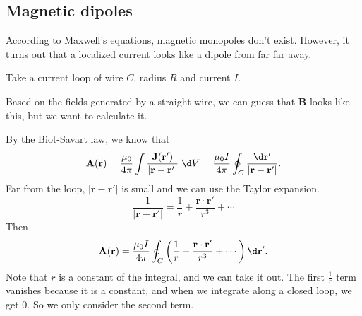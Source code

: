 \documentclass[a4paper]{article}
\begin{document}
\subsection{Magnetic dipoles}
According to Maxwell's equations, magnetic monopoles don't exist. However, it turns out that a localized current looks like a dipole from far far away.

\begin{eg}
  Take a current loop of wire $C$, radius $R$ and current $I$.
  \begin{center}
  \end{center}
  Based on the fields generated by a straight wire, we can guess that $\mathbf{B}$ looks like this, but we want to calculate it.

  By the Biot-Savart law, we know that
  \[
    \mathbf{A}(\mathbf{r}) = \frac{\mu_0}{4\pi}\int\frac{\mathbf{J}(\mathbf{r}')}{|\mathbf{r}-\mathbf{r}'|}\;\d V = \frac{\mu_0 I}{4\pi}\oint_C \frac{\d \mathbf{r}'}{|\mathbf{r} - \mathbf{r}'|}.
  \]
  Far from the loop, $|\mathbf{r} - \mathbf{r}'|$ is small and we can use the Taylor expansion.
  \[
    \frac{1}{|\mathbf{r} - \mathbf{r}'|} = \frac{1}{r} + \frac{\mathbf{r}\cdot \mathbf{r}'}{r^3} + \cdots
  \]
  Then
  \[
    \mathbf{A}(\mathbf{r}) = \frac{\mu_0 I}{4\pi}\oint_C \left(\frac{1}{r} + \frac{\mathbf{r}\cdot \mathbf{r}'}{r^3} + \cdots\right) \d \mathbf{r}'.
  \]
  Note that $r$ is a constant of the integral, and we can take it out. The first $\frac{1}{r}$ term vanishes because it is a constant, and when we integrate along a closed loop, we get 0. So we only consider the second term.


\end{eg}
\end{document}
